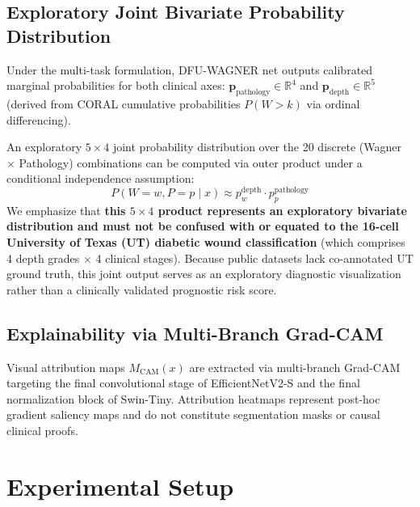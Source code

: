 \documentclass[journal]{IEEEtran}
\begin{document}
\subsection{Exploratory Joint Bivariate Probability Distribution}
Under the multi-task formulation, DFU-WAGNER net outputs calibrated marginal probabilities for both clinical axes: $\mathbf{p}_{\text{pathology}} \in \mathbb{R}^4$ and $\mathbf{p}_{\text{depth}} \in \mathbb{R}^5$ (derived from CORAL cumulative probabilities $P(W > k)$ via ordinal differencing). 

An exploratory $5 \times 4$ joint probability distribution over the 20 discrete (Wagner $\times$ Pathology) combinations can be computed via outer product under a conditional independence assumption:
\begin{equation}
    P(W = w, P = p \mid x) \approx p_{w}^{\text{depth}} \cdot p_{p}^{\text{pathology}}
\end{equation}
We emphasize that \textbf{this $5 \times 4$ product represents an exploratory bivariate distribution and must not be confused with or equated to the 16-cell University of Texas (UT) diabetic wound classification} (which comprises 4 depth grades $\times$ 4 clinical stages). Because public datasets lack co-annotated UT ground truth, this joint output serves as an exploratory diagnostic visualization rather than a clinically validated prognostic risk score.

\subsection{Explainability via Multi-Branch Grad-CAM}
Visual attribution maps $M_{\text{CAM}}(x)$ are extracted via multi-branch Grad-CAM \cite{selvaraju2017grad} targeting the final convolutional stage of EfficientNetV2-S and the final normalization block of Swin-Tiny. Attribution heatmaps represent post-hoc gradient saliency maps and do not constitute segmentation masks or causal clinical proofs.

\section{Experimental Setup}
\end{document}

